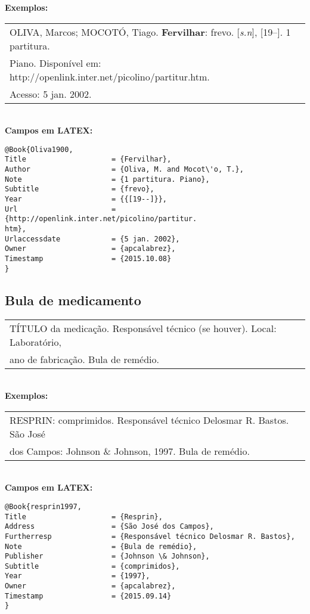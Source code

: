 \textbf{Exemplos:} \\

\begin{tabular}{|l|c|} \hline
	OLIVA, Marcos; MOCOTÓ, Tiago. \textbf{Fervilhar}: frevo. [\textit{s.n}], [19--]. 1 partitura.
	\\Piano. Disponível em: http://openlink.inter.net/picolino/partitur.htm.
	\\Acesso: 5 jan. 2002. 
	\\\hline
\end{tabular} \\

\textbf{Campos em LATEX:} 

\begin{verbatim}
@Book{Oliva1900,
Title                    = {Fervilhar},
Author                   = {Oliva, M. and Mocot\'o, T.},
Note                     = {1 partitura. Piano},
Subtitle                 = {frevo},
Year                     = {{[19--]}},
Url                      = {http://openlink.inter.net/picolino/partitur.
htm},
Urlaccessdate            = {5 jan. 2002},
Owner                    = {apcalabrez},
Timestamp                = {2015.10.08}
}
\end{verbatim}

\subsection{Bula de medicamento}

\begin{tabular}{|l|c|} \hline
	TÍTULO da medicação. Responsável técnico (se houver). Local: Laboratório, \\ano de fabricação. Bula de remédio. 
	\\\hline
\end{tabular} \\

\textbf{Exemplos:} \\

\begin{tabular}{|l|c|} \hline
	RESPRIN: comprimidos. Responsável técnico Delosmar R. Bastos. São José \\dos Campos: Johnson \& Johnson, 1997. Bula de remédio. 
	\\\hline
\end{tabular} \\

\textbf{Campos em LATEX:} 

\begin{verbatim}
@Book{resprin1997,
Title                    = {Resprin},
Address                  = {São José dos Campos},
Furtherresp              = {Responsável técnico Delosmar R. Bastos},
Note                     = {Bula de remédio},
Publisher                = {Johnson \& Johnson},
Subtitle                 = {comprimidos},
Year                     = {1997},
Owner                    = {apcalabrez},
Timestamp                = {2015.09.14}
}
\end{verbatim}

